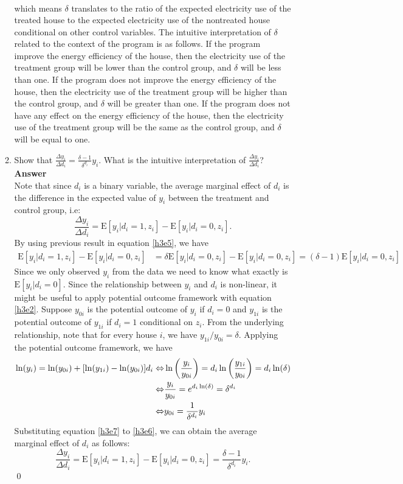 \documentclass{article}
\newcommand{\E}{\text{E}}
\begin{document}
\begin{enumerate}
\begin{enumerate}
\begin{align}
    \end{align}
    which means $\delta$ translates to the ratio of the expected electricity use of the treated house to the expected electricity use of the nontreated house conditional on other control variables. The intuitive interpretation of $\delta$ related to the context of the program is as follows. If the program improve the energy efficiency of the house, then the electricity use of the treatment group will be lower than the control group, and $\delta$ will be less than one. If the program does not improve the energy efficiency of the house, then the electricity use of the treatment group will be higher than the control group, and $\delta$ will be greater than one. If the program does not have any effect on the energy efficiency of the house, then the electricity use of the treatment group will be the same as the control group, and $\delta$ will be equal to one.
    \item Show that $\frac{\Delta y_i}{\Delta d_i}=\frac{\delta-1}{\delta^{d_i}}y_i$. What is the intuitive interpretation of $\frac{\Delta y_i}{\Delta d_i}$?
    \\\textbf{Answer}\\
    Note that since $d_i$ is a binary variable, the average marginal effect of $d_i$ is the difference in the expected value of $y_i$ between the treatment and control group, i.e:
    \[\frac{\Delta y_i}{\Delta d_i}=\E[y_i|d_i=1,z_i]-\E[y_i|d_i=0,z_i].\]
    By using previous result in equation \eqref{h3e5}, we have 
    \begin{align}
        \E[y_i|d_i=1,z_i]-\E[y_i|d_i=0,z_i]&=\delta\E[y_i|d_i=0,z_i]-\E[y_i|d_i=0,z_i]=(\delta-1)\E[y_i|d_i=0,z_i] \label{h3e6}
    \end{align}
    Since we only observed $y_i$ from the data we need to know what exactly is $\E[y_i|d_i=0]$. Since the relationship between $y_i$ and $d_i$ is non-linear, it might be useful to apply potential outcome framework with equation \eqref{h3e2}. Suppose $y_{0i}$ is the potential outcome of $y_i$ if $d_i=0$ and $y_{1i}$ is the potential outcome of $y_{1i}$ if $d_i=1$ conditional on $z_i$. From the underlying relationship, note that for every house $i$, we have $y_{1i}/y_{0i}=\delta$. Applying the potential outcome framework, we have
    \begin{align}
        \ln(y_i)=\ln(y_{0i})+[\ln(y_{1i})-\ln(y_{0i})]d_i
        \Leftrightarrow& \ln\left(\frac{y_i}{y_{0i}}\right)=d_i\ln\left(\frac{y_{1i}}{y_{0i}}\right)=d_i\ln(\delta) \notag\\
        \Leftrightarrow& \frac{y_i}{y_{0i}}=e^{d_i\ln(\delta)}=\delta^{d_i} \notag\\
        \Leftrightarrow& y_{0i}=\frac{1}{\delta^{d_i}}y_i \label{h3e7}
    \end{align}
    Substituting equation \eqref{h3e7} to \eqref{h3e6}, we can obtain the average marginal effect of $d_i$ as follows:
    \[\frac{\Delta y_i}{\Delta d_i}=\E[y_i|d_i=1,z_i]-\E[y_i|d_i=0,z_i]=\frac{\delta-1}{\delta^{d_i}}y_i.\]\qed


\end{enumerate}
\end{enumerate}
\end{document}
